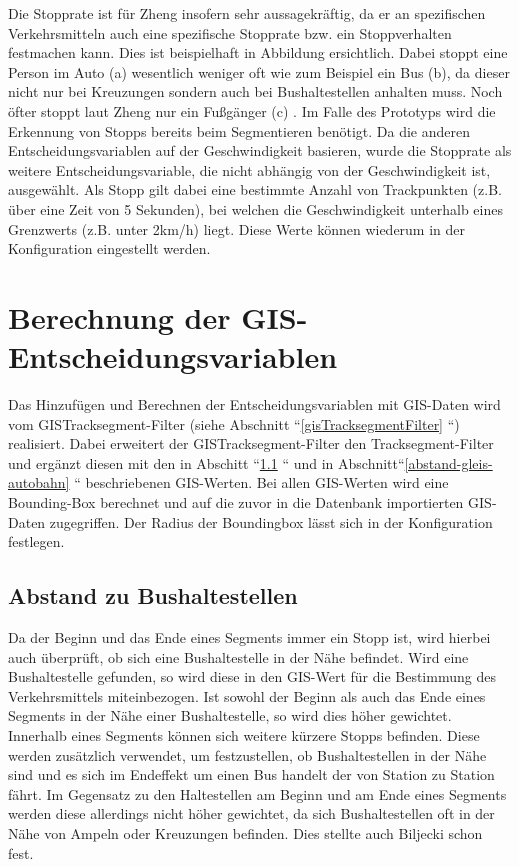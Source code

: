 Die Stopprate ist für Zheng insofern sehr aussagekräftig, da er an spezifischen Verkehrsmitteln auch eine spezifische Stopprate bzw. ein Stoppverhalten festmachen kann. Dies ist beispielhaft in Abbildung  ersichtlich. Dabei stoppt eine Person im Auto (a) wesentlich weniger oft wie zum Beispiel ein Bus (b), da dieser nicht nur bei Kreuzungen sondern auch bei Bushaltestellen anhalten muss. Noch öfter stoppt laut Zheng nur ein Fußgänger (c) \cite{zheng_understanding_2010}. Im Falle des Prototyps wird die Erkennung von Stopps bereits beim Segmentieren benötigt. Da die anderen Entscheidungsvariablen auf der Geschwindigkeit basieren, wurde die Stopprate als weitere Entscheidungsvariable, die nicht abhängig von der Geschwindigkeit ist, ausgewählt. Als Stopp gilt dabei eine bestimmte Anzahl von Trackpunkten (z.B. über eine Zeit von 5 Sekunden), bei welchen die Geschwindigkeit unterhalb eines Grenzwerts (z.B. unter 2km/h) liegt. Diese Werte können wiederum in der Konfiguration eingestellt werden.

\clearpage

\section{Berechnung der GIS-Entscheidungsvariablen}
\label{gisdaten}
Das Hinzufügen und Berechnen der Entscheidungsvariablen mit GIS-Daten wird vom GISTracksegment-Filter (siehe Abschnitt ``\ref{gisTracksegmentFilter} ``) realisiert. Dabei erweitert der GISTracksegment-Filter den Tracksegment-Filter und ergänzt diesen mit den in Abschitt ``\ref{abstand-bhst} `` und in Abschnitt``\ref{abstand-gleis-autobahn} `` beschriebenen GIS-Werten. Bei allen GIS-Werten wird eine Bounding-Box berechnet und auf die zuvor in die Datenbank importierten GIS-Daten zugegriffen. Der Radius der Boundingbox lässt sich in der Konfiguration festlegen.

\subsection{Abstand zu Bushaltestellen}
\label{abstand-bhst}
Da der Beginn und das Ende eines Segments immer ein Stopp ist, wird hierbei auch überprüft, ob sich eine Bushaltestelle in der Nähe befindet. Wird eine Bushaltestelle gefunden, so wird diese in den GIS-Wert für die Bestimmung des Verkehrsmittels miteinbezogen. Ist sowohl der Beginn als auch das Ende eines Segments in der Nähe einer Bushaltestelle, so wird dies höher gewichtet. 
Innerhalb eines Segments können sich weitere kürzere Stopps befinden. Diese werden zusätzlich verwendet, um festzustellen, ob Bushaltestellen in der Nähe sind und es sich im Endeffekt um einen Bus handelt der von Station zu Station fährt. Im Gegensatz zu den Haltestellen am Beginn und am Ende eines Segments werden diese allerdings nicht höher gewichtet, da sich Bushaltestellen oft in der Nähe von Ampeln oder Kreuzungen befinden. Dies stellte auch Biljecki \cite{biljecki_transportation_2013} schon fest.

